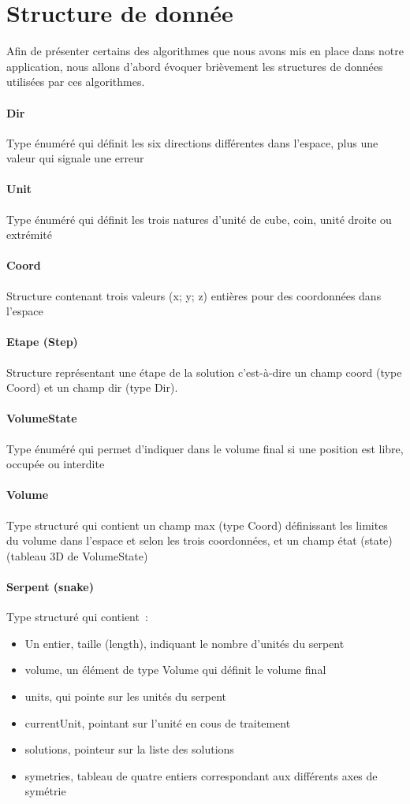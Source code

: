 \section{Structure de donnée}
Afin de présenter certains des algorithmes que nous avons mis en place dans notre application, nous allons d'abord évoquer brièvement les structures de données utilisées par ces algorithmes.

\paragraph{Dir} Type énuméré qui définit les six directions différentes dans l’espace, plus une valeur qui signale une erreur
\paragraph{Unit} Type énuméré qui définit les trois natures d’unité de cube, coin, unité droite ou extrémité
\paragraph{Coord} Structure contenant trois valeurs (x; y; z) entières pour des coordonnées dans l’espace
\paragraph{Etape (Step)} Structure représentant une étape de la solution c’est-à-dire un champ coord (type Coord) et un champ dir (type Dir).
\paragraph{VolumeState} Type énuméré qui permet d’indiquer dans le volume final si une position est libre, occupée ou interdite
\paragraph{Volume} Type structuré qui contient un champ max (type Coord) définissant les limites du volume dans l’espace et selon les trois coordonnées, et un champ état (state) (tableau 3D de VolumeState)
\paragraph{Serpent (snake)} Type structuré qui contient :
\begin{itemize}
 \item Un entier, taille (length), indiquant le nombre d’unités du serpent
 \item volume, un élément de type Volume qui définit le volume final
 \item units, qui pointe sur les unités du serpent
 \item currentUnit, pointant sur l’unité en cous de traitement
 \item solutions, pointeur sur la liste des solutions
 \item symetries, tableau de quatre entiers correspondant aux différents axes de symétrie
\end{itemize}
